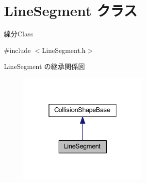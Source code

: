 \hypertarget{class_line_segment}{}\section{Line\+Segment クラス}
\label{class_line_segment}


線分\+Class  




{\ttfamily \#include $<$Line\+Segment.\+h$>$}



Line\+Segment の継承関係図\nopagebreak
\begin{figure}[H]
\begin{center}
\leavevmode
\includegraphics[width=184pt]{class_line_segment__inherit__graph}
\end{center}
\end{figure}
